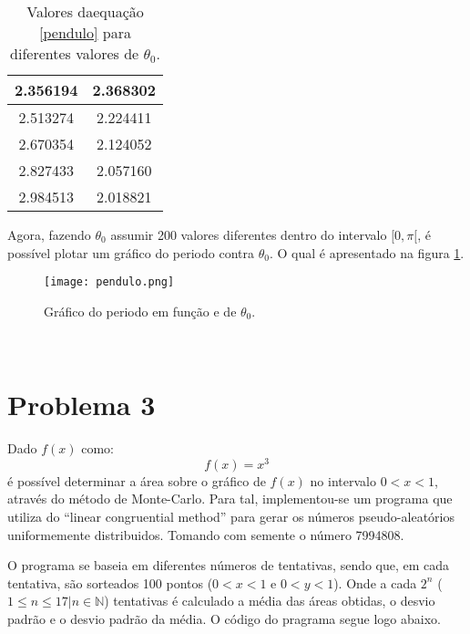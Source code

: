 \documentclass[a4paper,11pt, twoside]{article}
\begin{document}
{\begin{table}[!th]
\begin{center}
\begin{tabular}{ c c }
                2.356194 & 2.368302 \\
                \midrule
                2.513274 & 2.224411 \\
                \midrule
                2.670354 & 2.124052 \\
                \midrule
                2.827433 & 2.057160 \\
                \midrule
                2.984513 & 2.018821 \\
                \midrule
            \end{tabular}
        \end{center}
        \caption {Valores daequação \eqref{pendulo} para diferentes valores de $\theta_0$.}\label{tabpendulo}
    \end{table}}
    
    Agora, fazendo $\theta_0$ assumir 200 valores diferentes dentro do intervalo $[0, \pi [ $, é possível plotar um gráfico
    do periodo contra $\theta_0$. O qual é apresentado na figura \ref{pendgra}.
    \begin{figure}[!ht]
        \begin{center}
            \texttt{[image: pendulo.png]}
        \end{center}
        \caption{Gráfico do periodo em função e de $\theta_0$.}\label{pendgra}
    \end{figure}
    \\[1cm]
    \section*{Problema 3}
    Dado $f(x)$ como:
    \begin{equation}
        f(x) = x^3
    \end{equation}
    é possível determinar a área sobre o gráfico de $f(x)$ no intervalo $0 < x < 1$,
    através do método de Monte-Carlo.
    Para tal, implementou-se um programa que utiliza do ``linear congruential method'' para 
    gerar os números pseudo-aleatórios uniformemente distribuidos. Tomando com semente
    o número 7994808.
    
    O programa se baseia em diferentes números de tentativas, sendo que, em cada tentativa,
    são sorteados 100 pontos ($0 < x < 1$ e $0 < y < 1$). Onde a cada $2^n$ ($1 \le n \le 17 | n \in \mathbb{N}$) tentativas é
    calculado a média das áreas obtidas, o desvio padrão e o desvio padrão da média. O código do pragrama segue logo abaixo.
    {\linespread{1.15}
    }
    
\end{document}
